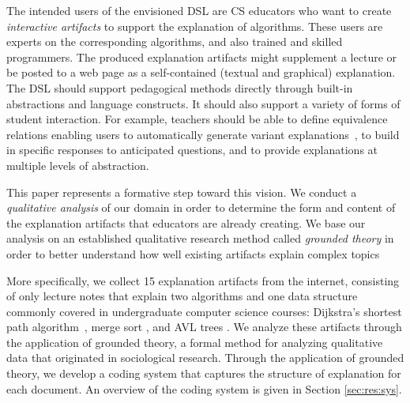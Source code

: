 \documentclass[sigconf]{acmart}
\begin{document}
The intended users of the envisioned DSL are CS educators who want to create
\emph{interactive artifacts} to support the explanation of algorithms. These
users are experts on the corresponding algorithms, and also trained and skilled
programmers. The produced explanation artifacts might supplement a lecture or
be posted to a web page as a self-contained (textual and graphical)
explanation.
%
The DSL should support pedagogical methods directly through built-in
abstractions and language constructs. It should also support a variety of forms
of student interaction. For example, teachers should be able to define
equivalence relations enabling users to automatically generate variant
explanations~\cite{EW13jvlc}, to build in specific responses to anticipated
questions, and to provide explanations at multiple levels of abstraction.


This paper represents a formative step toward this vision. We conduct a
\emph{qualitative analysis} of our domain in order to determine the form and
content of the explanation artifacts that educators are already creating.
%
We base our analysis on an established qualitative research method called
\emph{grounded theory}\cite{Strauss67discoveryof} in order to better understand how well existing artifacts
explain complex topics


More specifically, we collect 15 explanation artifacts from the internet,
consisting of only lecture notes that explain two algorithms and one
data structure commonly covered in undergraduate computer science courses:
Dijkstra's shortest path algorithm~\cite[pp.~137--142]{KT06}, merge sort
\cite[210--214]{KT06}, and AVL trees \cite[pp.~458--475]{KnuthArt3}.
%
We analyze these artifacts through the application of grounded
theory\cite{Strauss67discoveryof}, a formal method for analyzing qualitative
data that originated in sociological research. Through the application of
grounded theory, we develop a coding system that captures the structure of
explanation for each document. An overview of the coding system is given in
Section \ref{sec:res:sys}.

\end{document}
